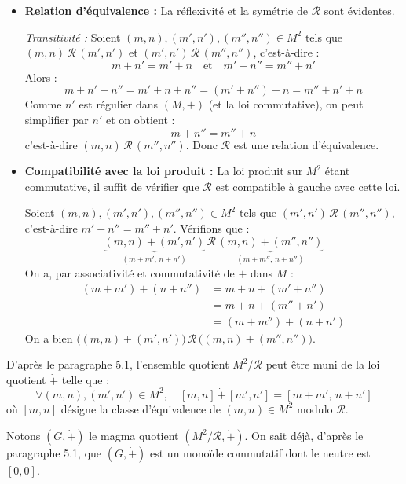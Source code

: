 \documentclass[a4paper,11pt]{article}
\begin{document}
\begin{demonstration}
\begin{itemize}
    \item \textbf{Relation d'équivalence :} La réflexivité et la symétrie de $\mathcal{R}$ sont évidentes.
    
    \textit{Transitivité :} Soient $(m, n), (m', n'), (m'', n'') \in M^2$ tels que $(m, n) \, \mathcal{R} \, (m', n')$ et $(m', n') \, \mathcal{R} \, (m'', n'')$, c'est-à-dire :
    \[
    m + n' = m' + n \quad \text{et} \quad m' + n'' = m'' + n'
    \]
    Alors :
    \[
    m + n' + n'' = m' + n + n'' = (m' + n'') + n = m'' + n' + n
    \]
    Comme $n'$ est régulier dans $(M, +)$ (et la loi commutative), on peut simplifier par $n'$ et on obtient :
    \[
    m + n'' = m'' + n
    \]
    c'est-à-dire $(m, n) \, \mathcal{R} \, (m'', n'')$. Donc $\mathcal{R}$ est une relation d'équivalence.

    \item \textbf{Compatibilité avec la loi produit :} La loi produit sur $M^2$ étant commutative, il suffit de vérifier que $\mathcal{R}$ est compatible à gauche avec cette loi.
    
    Soient $(m, n), (m', n'), (m'', n'') \in M^2$ tels que $(m', n') \, \mathcal{R} \, (m'', n'')$, c'est-à-dire $m' + n'' = m'' + n'$.
    Vérifions que :
    \[
    \underbrace{(m, n) + (m', n')}_{(m + m', \, n + n')} \, \mathcal{R} \, \underbrace{(m, n) + (m'', n'')}_{(m + m'', \, n + n'')}
    \]
    On a, par associativité et commutativité de $+$ dans $M$ :
    \begin{align*}
        (m + m') + (n + n'') &= m + n + (m' + n'') \\
                             &= m + n + (m'' + n') \\
                             &= (m + m'') + (n + n')
    \end{align*}
    On a bien $\big((m, n) + (m', n')\big) \, \mathcal{R} \, \big((m, n) + (m'', n'')\big)$.
\end{itemize}
\end{demonstration}

D'après le paragraphe 5.1, l'ensemble quotient $M^2 / \mathcal{R}$ peut être muni de la loi quotient $\dot{+}$ telle que :
\[
\forall (m, n), (m', n') \in M^2, \quad [m, n] \, \dot{+} \, [m', n'] = [m + m', \, n + n']
\]
où $[m, n]$ désigne la classe d'équivalence de $(m, n) \in M^2$ modulo $\mathcal{R}$.

Notons $(G, \dot{+})$ le magma quotient $(M^2 / \mathcal{R}, \dot{+})$. On sait déjà, d'après le paragraphe 5.1, que $(G, \dot{+})$ est un monoïde commutatif dont le neutre est $[0, 0]$.
\end{document}
